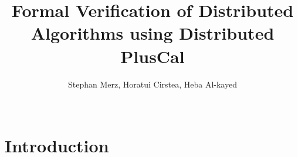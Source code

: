 \documentclass[journal]{IEEEtran}
\begin{document}
    \title{Formal Verification of Distributed Algorithms using Distributed PlusCal}
  \author{Stephan Merz, Horatui Cirstea, Heba Al-kayed \\~
}  

\maketitle


\begin{abstract}

\end{abstract}


\begin{IEEEkeywords}
\hl{}
\end{IEEEkeywords}






%
\IEEEpeerreviewmaketitle













\section{Introduction}
\end{document}
